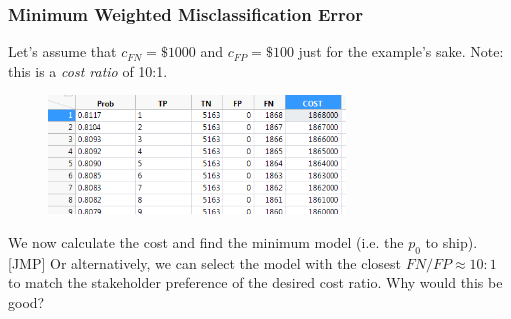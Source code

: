 \documentclass[slides]{beamer} %
\begin{document}
\begin{frame}\frametitle{Minimum Weighted Misclassification Error}

Let's assume that $c_{FN} = \$1000$ and $c_{FP} = \$100$ just for the example's sake. Note: this is a \emph{cost ratio} of 10:1.

\vspace{-0.2cm}
\begin{figure}
\centering
\hspace{-0.5cm}\includegraphics[width=3.1in]{weighted_misclassification_costs.png}
\end{figure}

We now calculate the cost and find the minimum model (i.e. the $p_0$ to ship). [JMP] \pause Or alternatively, we can select the model with the closest $FN / FP \approx 10:1$ to match the stakeholder preference of the desired cost ratio. Why would this be good?



	
\end{frame}
\end{document}
